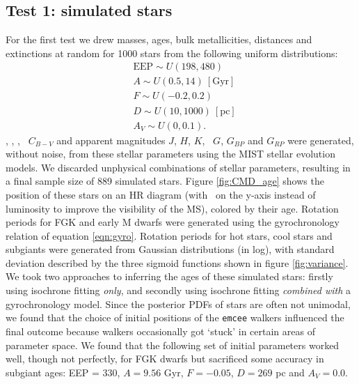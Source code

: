 \subsection{Test 1: simulated stars}
For the first test we drew masses, ages, bulk metallicities, distances and
extinctions at random for 1000 stars from the following uniform distributions:
\begin{eqnarray}
& \mathrm{EEP} \sim U(198, 480) \\
& A \sim U(0.5, 14)\mathrm{~[Gyr]} \\
& F \sim U(-0.2, 0.2) \\
& D \sim U(10, 1000)~\mathrm{[pc]} \\
& A_V \sim U(0, 0.1).
\end{eqnarray}
\teff, \logg, \fhat, \pmega\, $C_{B-V}$ and apparent magnitudes $J$, $H$, $K$,
\gaia\ $G$, $G_{BP}$ and $G_{RP}$ were generated, without noise, from these
stellar parameters using the MIST stellar evolution models.
We discarded unphysical combinations of stellar parameters, resulting in a
final sample size of 889 simulated stars.
Figure \ref{fig:CMD_age} shows the position of these stars on an HR diagram
(with \logg\ on the y-axis instead of luminosity to improve the visibility of
the MS), colored by their age.
Rotation periods for FGK and early M dwarfs were generated using the
gyrochronology relation of equation \ref{eqn:gyro}.
Rotation periods for hot stars, cool stars and subgiants were generated from
Gaussian distributions (in log), with standard deviation described by the
three sigmoid functions shown in figure \ref{fig:variance}.
We took two approaches to inferring the ages of these simulated stars:
firstly using isochrone fitting {\it only}, and secondly using isochrone
fitting {\it combined with} a gyrochronology model.
Since the posterior PDFs of stars are often not unimodal, we found that the
choice of initial positions of the {\tt emcee} walkers influenced the final
outcome because walkers occasionally got `stuck' in certain areas of
parameter space.
We found that the following set of initial parameters worked well, though not
perfectly, for FGK dwarfs but sacrificed some accuracy in subgiant ages: EEP =
330, $A = 9.56$ Gyr, $F = -0.05$, $D = 269$ pc and $A_V = 0.0$.
